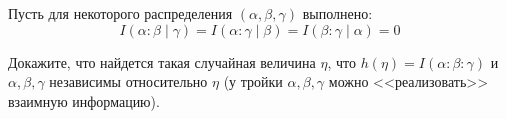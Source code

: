 Пусть для некоторого распределения $(\alpha, \beta, \gamma)$ выполнено:
$$
    I(\alpha : \beta \mid \gamma) = I(\alpha : \gamma \mid \beta) = I(\beta : \gamma \mid \alpha) = 0
$$

Докажите, что найдется такая случайная величина $\eta$, что $h(\eta) = I(\alpha : \beta : \gamma)$ и
$\alpha, \beta, \gamma$ независимы относительно $\eta$ (у тройки $\alpha, \beta, \gamma$ можно
<<реализовать>> взаимную информацию).